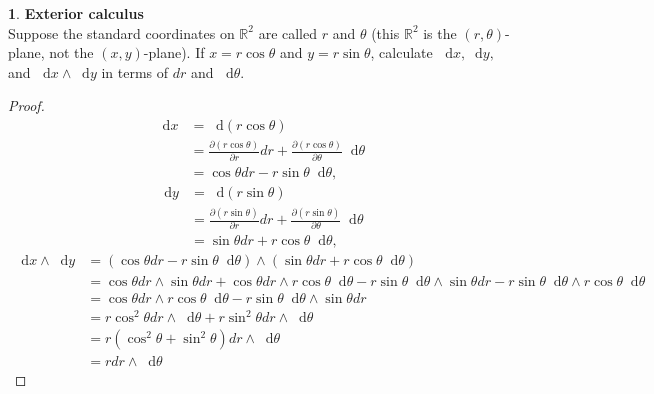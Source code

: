 \documentclass[12pt]{article}
\newcommand{\dd}{\mathop{}\!\mathrm{d}}
\theoremstyle{definition}
\newtheorem{ex}{}[section]
\begin{document}
\begin{ex}
	\textbf{Exterior calculus} \\
	Suppose the standard coordinates on $\mathbb{R}^2$ are called $r$ and $\theta$ (this $\mathbb{R}^2$ is the $(r, \theta)$-plane, not the $(x, y)$-plane).
	If $x = r\cos\theta$ and $y=r\sin\theta$, calculate $\dd x, \dd y,$ and $\dd x \wedge \dd y$ in terms of $dr$ and $\dd\theta$.
\end{ex}
\begin{proof}
	\begin{align*}
		\dd x & = \dd(r\cos\theta)                                                                                    \\
		      & = \frac{\partial(r\cos\theta)}{\partial r}dr + \frac{\partial(r\cos\theta)}{\partial \theta}\dd\theta \\
		      & = \cos\theta dr - r\sin\theta \dd\theta,
	\end{align*}
	\begin{align*}
		\dd y & = \dd(r\sin\theta)                                                                                    \\
		      & = \frac{\partial(r\sin\theta)}{\partial r}dr + \frac{\partial(r\sin\theta)}{\partial \theta}\dd\theta \\
		      & = \sin\theta dr + r\cos\theta \dd\theta,
	\end{align*}
	\begin{align*}
		\dd x \wedge \dd y & = (\cos\theta dr - r\sin\theta \dd\theta) \wedge (\sin\theta dr + r \cos\theta \dd\theta)                                                                                          \\
		                   & = \cos\theta dr \wedge \sin\theta dr + \cos\theta dr \wedge r\cos\theta \dd\theta -r\sin\theta \dd\theta \wedge \sin\theta dr - r\sin\theta \dd\theta \wedge r\cos\theta \dd\theta \\
		                   & =  \cos\theta dr \wedge r\cos\theta \dd\theta -r\sin\theta \dd\theta \wedge \sin\theta dr                                                                                          \\
		                   & = r\cos^2\theta dr \wedge \dd\theta + r\sin^2\theta dr\wedge \dd\theta                                                                                                             \\
		                   & = r(\cos^2\theta + \sin^2\theta) dr\wedge \dd\theta                                                                                                                                \\
		                   & = r dr\wedge \dd\theta
	\end{align*}
\end{proof}
\end{document}
